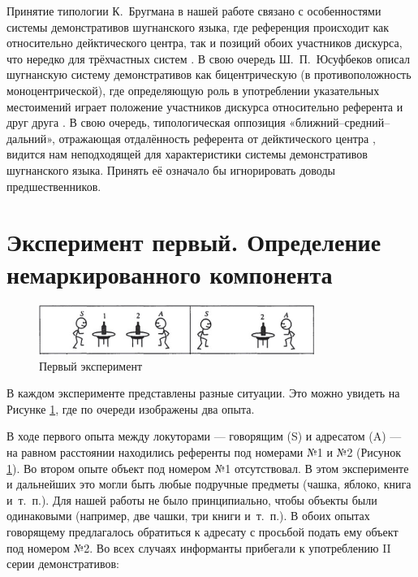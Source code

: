 Принятие типологии К.~Бругмана в нашей работе связано с особенностями системы демонстративов шугнанского языка, где референция происходит как относительно дейктического центра, так и позиций обоих участников дискурса, что нередко для трёхчастных систем \parencite[38–41]{diessel1999}. В свою очередь Ш.~П.~Юсуфбеков описал шугнанскую систему демонстративов как бицентрическую (в противоположность моноцентрической), где определяющую роль в употреблении указательных местоимений играет положение участников дискурса относительно референта и друг друга \parencite[138–139]{yusufbekov1998}. В свою очередь, типологическая оппозиция «ближний–средний–дальний», отражающая отдалённость референта от дейктического центра \parencite[39]{diessel1999}, видится нам неподходящей для характеристики системы демонстративов шугнанского языка. Принять её означало бы игнорировать доводы предшественников.

\vfill

\section{Эксперимент первый. Определение немаркированного компонента} \label{dem-exp1}

\begin{figure}[h]
 \centering
 \caption{Первый эксперимент \parencite[28]{popiel2009}}
 \smallskip
 \label{fig:dem1}
 \includegraphics[width=0.8\textwidth]{img/dem1.jpg}
\end{figure}

В каждом эксперименте представлены разные ситуации. Это можно увидеть на Рисунке \ref{fig:dem1}, где по очереди изображены два опыта.

В ходе первого опыта между локуторами — говорящим (S) и адресатом (A) — на равном расстоянии находились референты под номерами №1 и №2 (Рисунок \ref{fig:dem1}). Во втором опыте объект под номером №1 отсутствовал. В этом эксперименте и дальнейших это могли быть любые подручные предметы (чашка, яблоко, книга и~т.~п.). Для нашей работы не было принципиально, чтобы объекты были одинаковыми (например, две чашки, три книги и~т.~п.). В обоих опытах говорящему предлагалось обратиться к адресату с просьбой подать ему объект под номером №2. Во всех случаях информанты прибегали к употреблению II серии демонстративов:

